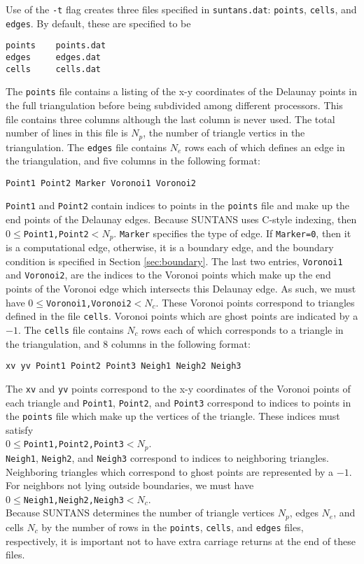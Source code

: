 \documentclass[12pt,oneside]{article}
\begin{document}
Use of the \verb+-t+ flag creates three files specified in \verb+suntans.dat+: 
\verb+points+, \verb+cells+, and \verb+edges+.  By default, these are specified
to be
\begin{verbatim}
points    points.dat
edges     edges.dat
cells     cells.dat
\end{verbatim}
The \verb+points+ file contains a listing of the x-y coordinates of the Delaunay points
in the full triangulation before being subdivided among different processors. 
This file contains three columns although the last column is never used.  The
total number of lines in this file is $N_p$, the number of triangle vertics in the triangulation.
The \verb+edges+ file contains $N_e$ rows each of which defines an
edge in the triangulation, and five columns in the following format:
\begin{verbatim}
Point1 Point2 Marker Voronoi1 Voronoi2
\end{verbatim}
\verb+Point1+ and \verb+Point2+ contain indices to points in the \verb+points+ file
and make up the end points of the Delaunay edges.  Because SUNTANS uses C-style
indexing, then $0\le$\verb+Point1,Point2+$<N_p$.  \verb+Marker+ specifies the type
of edge.  If \verb+Marker=0+, then it is a computational edge, otherwise, it is
a boundary edge, and the boundary condition is specified in Section \ref{sec:boundary}.
The last two entries, \verb+Voronoi1+ and \verb+Voronoi2+, are the indices to the Voronoi
points which make up the end points of the Voronoi edge which intersects this Delaunay edge.
As such, we must have $0\le$\verb+Voronoi1,Voronoi2+$<N_c$.
These Voronoi points correspond to triangles defined in the file \verb+cells+.  Voronoi points
which are ghost points are indicated by a $-1$.
The \verb+cells+ file contains $N_c$ rows each of which corresponds to a
triangle in the triangulation, and 8 columns in the following format:
\begin{verbatim}
xv yv Point1 Point2 Point3 Neigh1 Neigh2 Neigh3
\end{verbatim}
The \verb+xv+ and \verb+yv+ points correspond to the x-y coordinates
of the Voronoi points of each triangle and \verb+Point1+, \verb+Point2+, and \verb+Point3+
correspond to indices to points in the \verb+points+ file which make up the
vertices of the triangle.  These indices must satisfy \\
$0\le$\verb+Point1,Point2,Point3+$<N_p$. \\
\verb+Neigh1+, \verb+Neigh2+, and
\verb+Neigh3+ correspond to indices to neighboring triangles.  Neighboring
triangles which correspond to ghost points are represented by a $-1$.  For neighbors
not lying outside boundaries, we must have \\
$0\le$\verb+Neigh1,Neigh2,Neigh3+$<N_c$.\\
Because SUNTANS determines the number of triangle vertices $N_p$, edges $N_e$, and cells $N_c$
by the number of rows in the \verb+points+, \verb+cells+, and \verb+edges+ files, respectively,
it is important not to have extra carriage returns at the end of these files.
\end{document}

